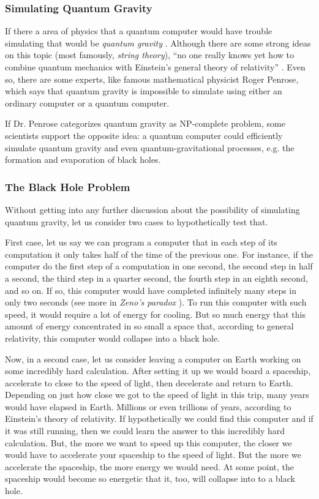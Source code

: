 \documentclass[twoside,11pt]{article}
\begin{document}
\subsubsection{Simulating Quantum Gravity}

If there a area of physics that  a quantum computer would have trouble simulating that would be \emph{quantum gravity} \citep{hamber2009quantum}. 
Although there are some strong ideas on this topic (most famously, \emph{string theory}), ``no one really knows yet how to combine quantum mechanics with Einstein’s general theory of relativity'' \citep{scott16}.
Even so, there are some experts, like famous mathematical physicist Roger Penrose, which says that quantum gravity is impossible to simulate using either an ordinary computer or a quantum computer.


If Dr. Penrose categorizes quantum gravity as NP-complete problem, some scientists support the opposite idea: a quantum computer could efficiently simulate quantum gravity and even quantum-gravitational processes, e.g. the formation and evaporation of black holes.

\subsubsection{The Black Hole Problem}

Without getting into any further discussion about the possibility of simulating quantum gravity, let us consider two cases to hypothetically test that.

First case, let us say we can program a computer that in each step of its computation it only takes half of the time of the previous one.
For instance, if the computer do the first step of a computation in one second, the second step in half a second, the third step in a quarter second, the fourth step in an eighth second, and so on.
If so, this computer would have completed infinitely many steps in only two seconds (see more in \emph{Zeno’s paradox} \citep{erickson1998dictionary}).
To run this computer with such speed, it would require a lot of energy for cooling.
But so much energy that this amount of energy concentrated in so small a space that, according to general relativity, this computer would collapse into a black hole.

Now, in a second case, let us consider leaving a computer on Earth working on some incredibly hard calculation.
After setting it up we would board a spaceship, accelerate to close to the speed of light, then decelerate and return to Earth.
Depending on just how close we got to the speed of light in this trip, many years would have elapsed in Earth.
Millions or even trillions of years, according to Einstein’s  theory of relativity.
If hypothetically we could find this computer and if it was still running, then we could learn the answer to this incredibly hard calculation.
But, the more we want to speed up this computer, the closer we would have to accelerate your spaceship to the speed of light. 
But the more we accelerate the spaceship, the more energy we would need.
At some point, the spaceship would become so energetic that it, too, will collapse into to a black hole.
 
\end{document}

